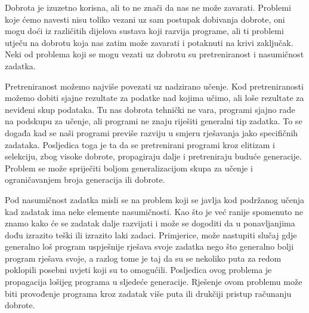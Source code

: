 \par
Dobrota je izuzetno korisna, ali to ne znači da nas ne može zavarati. Problemi koje ćemo navesti nisu toliko vezani uz sam postupak dobivanja dobrote, oni mogu doći iz različitih dijelova sustava koji razvija programe, ali ti problemi utječu na dobrotu koja nas zatim može zavarati i potaknuti na krivi zaključak. Neki od problema koji se mogu vezati uz dobrotu su pretreniranost i nasumičnost zadatka.\par 
Pretreniranost možemo najviše povezati uz nadzirano učenje. Kod pretreniranosti možemo dobiti sjajne rezultate za podatke nad kojima učimo, ali loše rezultate za neviđeni skup podataka. Tu nas dobrota tehnički ne vara, programi sjajno rade na podskupu za učenje, ali programi ne znaju riješiti generalni tip zadatka. To se događa kad se naši programi previše razviju u smjeru rješavanja jako specifičnih zadataka. Posljedica toga je ta da se pretrenirani programi kroz elitizam i selekciju, zbog visoke dobrote, propagiraju dalje i pretreniraju buduće generacije. Problem se može spriječiti boljom generalizacijom skupa za učenje i ograničavanjem broja generacija ili dobrote.
\par
Pod nasumičnost zadatka misli se na problem koji se javlja kod podržanog učenja kad zadatak ima neke elemente nasumičnosti. Kao što je već ranije spomenuto ne znamo kako će se zadatak dalje razvijati i može se dogoditi da u ponavljanjima dođu izrazito teški ili izrazito laki zadaci. Primjerice, može nastupiti slučaj gdje generalno loš program uspješnije rješava svoje zadatka nego što generalno bolji program rješava svoje, a razlog tome je taj da su se nekoliko puta za redom poklopili posebni uvjeti koji su to omogućili. Posljedica ovog problema je propagacija lošijeg programa u sljedeće generacije. Rješenje ovom problemu može biti provođenje programa kroz zadatak više puta ili drukčiji pristup računanju dobrote.

